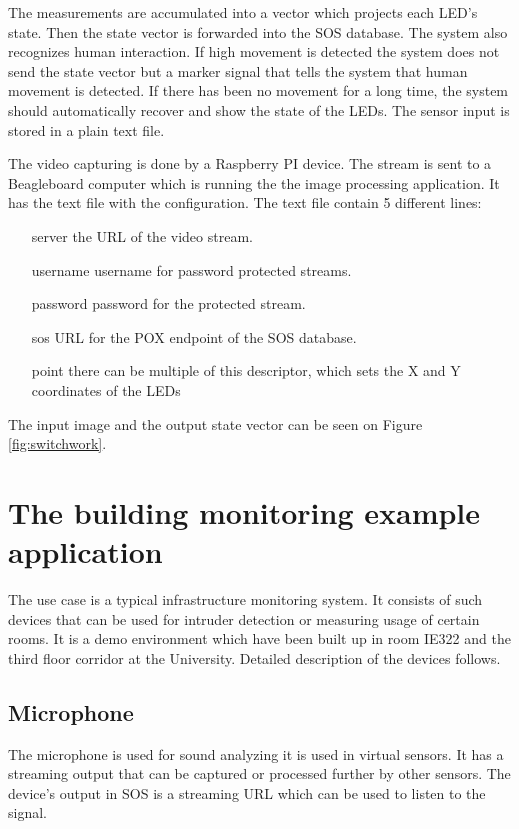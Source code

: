 The measurements are accumulated into a vector which projects each LED's state. Then the state vector is forwarded into the SOS database. The system also recognizes human interaction. If high movement is detected the system does not send the state vector but a marker signal that tells the system that human movement is detected. If there has been no movement for a long time, the system should automatically recover and show the state of the LEDs. The sensor input is stored in a plain text file.

The video capturing is done by a Raspberry PI device. The stream is sent to a Beagleboard computer which is running the the image processing application. It has the text file with the configuration. The text file contain 5 different lines:
\begin{itemize}
	\item[server] the URL of the video stream.
	\item[username] username for password protected streams.
	\item[password] password for the protected stream.
	\item[sos] URL for the POX endpoint of the SOS database.
	\item[point] there can be multiple of this descriptor, which sets the X and Y coordinates of the LEDs
\end{itemize}	
The input image and the output state vector can be seen on Figure \ref{fig:switchwork}.


\section{The building monitoring example application}

The use case is a typical infrastructure monitoring system. It consists of such devices that can be used for intruder detection or measuring usage of certain rooms. It is a demo environment which have been built up in room IE322 and the third floor corridor at the University.
Detailed description of the devices follows.

\subsection*{Microphone}
 The microphone is used for sound analyzing it is used in virtual sensors. It has a streaming output that can be captured or processed further by other sensors. The device's output in SOS is a streaming URL which can be used to listen to the signal. 
 
